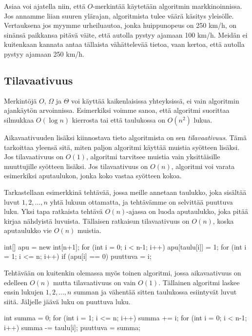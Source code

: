 Asiaa voi ajatella niin, että $O$-merkintää käytetään algoritmin
markkinoinnissa. Jos annamme liian suuren ylärajan, algoritmista
tulee väärä käsitys yleisölle.
Vertauksena jos myymme urheiluautoa, jonka huippunopeus on 250 km/h,
on sinänsä paikkansa pitävä väite, että autolla pystyy ajamaan 100 km/h.
Meidän ei kuitenkaan kannata antaa tällaista vähättelevää tietoa,
vaan kertoa, että autolla pystyy ajamaan 250 km/h.

\subsection{Tilavaativuus}

Merkintöjä $O$, $\Omega$ ja $\Theta$ voi käyttää
kaikenlaisissa yhteyksissä, ei vain algoritmin ajankäytön arvoinnissa.
Esimerkiksi voimme sanoa, että algoritmi suorittaa silmukkaa $O(\log n)$ kierrosta
tai että taulukossa on $O(n^2)$ lukua.

Aikavaativuuden lisäksi kiinnostava tieto algoritmista on sen
\emph{tilavaativuus}. Tämä tarkoittaa yleensä sitä, miten paljon algoritmi
käyttää muistia syötteen lisäksi.
Jos tilavaativuus on $O(1)$, algoritmi tarvitsee muistia
vain yksittäisille muuttujille syötteen lisäksi.
Jos tilavaativuus on $O(n)$, algoritmi voi varata esimerkiksi aputaulukon,
jonka koko vastaa syötteen kokoa.

Tarkastellaan esimerkkinä tehtävää, jossa meille annetaan taulukko,
joka sisältää luvut $1,2,\dots,n$ yhtä lukuun ottamatta,
ja tehtävämme on selvittää puuttuva luku.
Yksi tapa ratkaista tehtävä $O(n)$-ajassa on luoda aputaulukko,
joka pitää kirjaa nähdyistä luvuista.
Tällaisen ratkaisun tilavaativuus on $O(n)$,
koska aputaulukko vie $O(n)$ muistia.

\begin{code}
int[] apu = new int[n+1];
for (int i = 0; i < n-1; i++) {
    apu[taulu[i]] = 1;
}
for (int i = 1; i <= n; i++) {
    if (apu[i] == 0) puuttuva = i;
}
\end{code}

Tehtävään on kuitenkin olemassa myös toinen algoritmi,
jossa aikavaativuus on edelleen $O(n)$ mutta tilavaativuus on vain $O(1)$.
Tällainen algoritmi laskee ensin lukujen $1,2,\dots,n$ summan
ja vähentää sitten taulukossa esiintyvät luvut siitä.
Jäljelle jäävä luku on puuttuva luku.

\begin{code}
int summa = 0;
for (int i = 1; i <= n; i++) {
    summa += i;
}
for (int i = 0; i < n-1; i++) {
    summa -= taulu[i];
}
puuttuva = summa;
\end{code}

